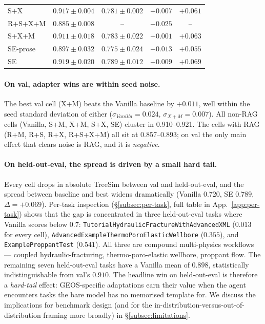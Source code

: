\documentclass{article}
\begin{document}
\begin{table}[t]
\begin{tabular}{lcccc}
    S$+$X          & $0.917 \pm 0.004$           & $0.781 \pm \mathbf{0.002}$   & $+0.007$          & $+0.061$          \\
    R$+$S$+$X$+$M  & $0.885 \pm 0.008$           & --                           & $-0.025$          & --                \\
    S$+$X$+$M      & $0.911 \pm 0.018$           & $0.783 \pm 0.022$            & $+0.001$          & $+0.063$          \\
    SE-prose       & $0.897 \pm 0.032$           & $0.775 \pm 0.024$            & $-0.013$          & $+0.055$          \\
    SE             & $0.919 \pm 0.020$           & $\mathbf{0.789 \pm 0.012}$   & $+0.009$          & $\mathbf{+0.069}$ \\
    \bottomrule
  \end{tabular}
\end{table}

\paragraph{On val, adapter wins are within seed noise.} The best val cell (X+M) beats the Vanilla baseline by $+0.011$, well within the seed standard deviation of either ($\sigma_{Vanilla}=0.024$, $\sigma_{X+M}=0.007$). All non-RAG cells (Vanilla, S+M, X+M, S+X, SE) cluster in 0.910--0.921. The cells with RAG (R+M, R+S, R+X, R+S+X+M) all sit at 0.857--0.893; on val the only main effect that clears noise is RAG, and it is \emph{negative}.

\paragraph{On held-out-eval, the spread is driven by a small hard tail.} Every cell drops in absolute TreeSim between val and held-out-eval, and the spread between baseline and best widens dramatically (Vanilla $0.720$, SE $0.789$, $\Delta = +0.069$). Per-task inspection (\S\ref{subsec:per-task}, full table in App.~\ref{app:per-task}) shows that the gap is concentrated in three held-out-eval tasks where Vanilla scores below $0.7$: \texttt{TutorialHydraulicFractureWithAdvancedXML} ($0.013$ for every cell), \texttt{AdvancedExampleThermoPoroElasticWellbore} ($0.355$), and \texttt{ExampleProppantTest} ($0.541$). All three are compound multi-physics workflows --- coupled hydraulic-fracturing, thermo-poro-elastic wellbore, proppant flow. The remaining seven held-out-eval tasks have a Vanilla mean of $0.898$, statistically indistinguishable from val's $0.910$. The headline win on held-out-eval is therefore a \emph{hard-tail} effect: GEOS-specific adaptations earn their value when the agent encounters tasks the bare model has no memorised template for. We discuss the implications for benchmark design (and for the in-distribution-versus-out-of-distribution framing more broadly) in \S\ref{subsec:limitations}.
\end{document}
